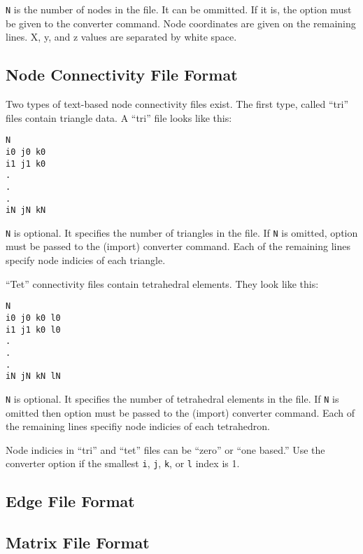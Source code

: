 \verb|N| is the number of nodes in the file.  It can be ommitted.
If it is, the  option must be given to the
converter command.  Node coordinates are given on the remaining
lines. X, y, and z values are separated by white space.

\subsection{Node Connectivity File Format}
\label{sec:node_conn_fmt}

Two types of text-based node connectivity files exist.  The first
type, called ``tri'' files contain triangle data.  A ``tri'' file
looks like this:

\begin{verbatim}
N
i0 j0 k0
i1 j1 k0
.
.
.
iN jN kN
\end{verbatim}

\verb|N| is optional.  It specifies the number of triangles in the
file.  If \verb|N| is omitted, option  must
be passed to the (import) converter command.  Each of the remaining lines
specify node indicies of each triangle.

``Tet'' connectivity files contain tetrahedral elements.  They look
like this:

\begin{verbatim}
N
i0 j0 k0 l0
i1 j1 k0 l0
.
.
.
iN jN kN lN
\end{verbatim}

\verb|N| is optional.  It specifies the number of tetrahedral elements in the
file.  If \verb|N| is omitted then option  must
be passed to the (import) converter command.  Each of the remaining lines
specifiy node indicies of each tetrahedron.

Node indicies in ``tri'' and ``tet'' files can be ``zero'' or ``one
based.''  Use the converter option  if the
smallest \verb|i|, \verb|j|, \verb|k|, or \verb|l| index is 1.


\subsection{Edge File Format}




\subsection{Matrix File Format}
\label{sec:matrix_fmt}

